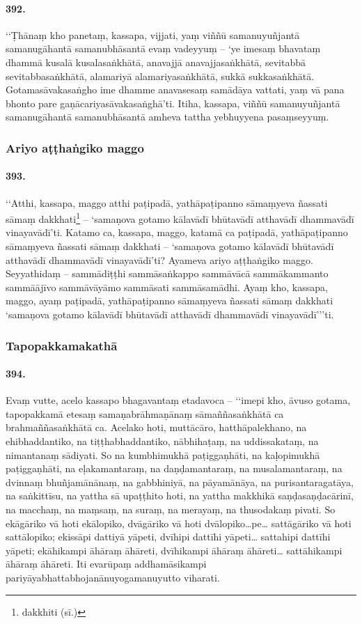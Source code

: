\paragraph{392.} ‘‘Ṭhānaṃ kho panetaṃ, kassapa, vijjati, yaṃ viññū samanuyuñjantā samanugāhantā samanubhāsantā evaṃ vadeyyuṃ – ‘ye imesaṃ bhavataṃ dhammā kusalā kusalasaṅkhātā, anavajjā anavajjasaṅkhātā, sevitabbā sevitabbasaṅkhātā, alamariyā alamariyasaṅkhātā, sukkā sukkasaṅkhātā. Gotamasāvakasaṅgho ime dhamme anavasesaṃ samādāya vattati, yaṃ vā pana bhonto pare gaṇācariyasāvakasaṅghā’ti. Itiha, kassapa, viññū samanuyuñjantā samanugāhantā samanubhāsantā amheva tattha yebhuyyena pasaṃseyyuṃ.

\subsubsection{Ariyo aṭṭhaṅgiko maggo}

\paragraph{393.} ‘‘Atthi, kassapa, maggo atthi paṭipadā, yathāpaṭipanno sāmaṃyeva ñassati sāmaṃ dakkhati\footnote{dakkhiti (sī.)} – ‘samaṇova gotamo kālavādī bhūtavādī atthavādī dhammavādī vinayavādī’ti. Katamo ca, kassapa, maggo, katamā ca paṭipadā, yathāpaṭipanno sāmaṃyeva ñassati sāmaṃ dakkhati – ‘samaṇova gotamo kālavādī bhūtavādī atthavādī dhammavādī vinayavādī’ti? Ayameva ariyo aṭṭhaṅgiko maggo. Seyyathidaṃ – sammādiṭṭhi sammāsaṅkappo sammāvācā sammākammanto sammāājīvo sammāvāyāmo sammāsati sammāsamādhi. Ayaṃ kho, kassapa, maggo, ayaṃ paṭipadā, yathāpaṭipanno sāmaṃyeva ñassati sāmaṃ dakkhati ‘samaṇova gotamo kālavādī bhūtavādī atthavādī dhammavādī vinayavādī’’’ti.

\subsubsection{Tapopakkamakathā}

\paragraph{394.} Evaṃ vutte, acelo kassapo bhagavantaṃ etadavoca – ‘‘imepi kho, āvuso gotama, tapopakkamā etesaṃ samaṇabrāhmaṇānaṃ sāmaññasaṅkhātā ca brahmaññasaṅkhātā ca. Acelako hoti, muttācāro, hatthāpalekhano, na ehibhaddantiko, na tiṭṭhabhaddantiko, nābhihaṭaṃ, na uddissakataṃ, na nimantanaṃ sādiyati. So na kumbhimukhā paṭiggaṇhāti, na kaḷopimukhā paṭiggaṇhāti, na eḷakamantaraṃ, na daṇḍamantaraṃ, na musalamantaraṃ, na dvinnaṃ bhuñjamānānaṃ, na gabbhiniyā, na pāyamānāya, na purisantaragatāya, na saṅkittīsu, na yattha sā upaṭṭhito hoti, na yattha makkhikā saṇḍasaṇḍacārinī, na macchaṃ, na maṃsaṃ, na suraṃ, na merayaṃ, na thusodakaṃ pivati. So ekāgāriko vā hoti ekālopiko, dvāgāriko vā hoti dvālopiko…pe… sattāgāriko vā hoti sattālopiko; ekissāpi dattiyā yāpeti, dvīhipi dattīhi yāpeti… sattahipi dattīhi yāpeti; ekāhikampi āhāraṃ āhāreti, dvīhikampi āhāraṃ āhāreti… sattāhikampi āhāraṃ āhāreti. Iti evarūpaṃ addhamāsikampi pariyāyabhattabhojanānuyogamanuyutto viharati.


